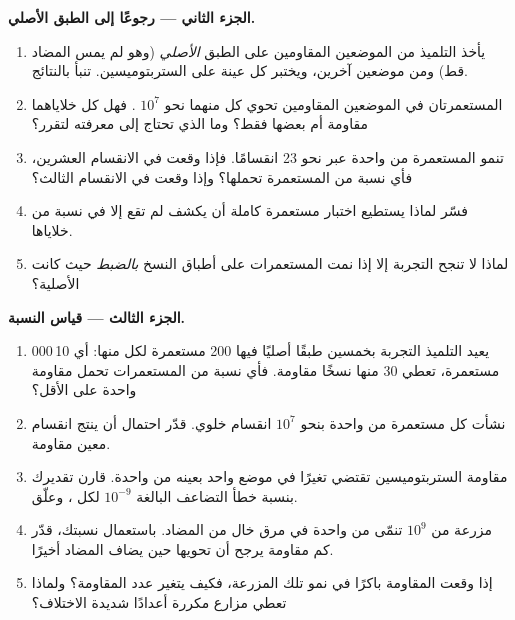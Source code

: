 \begin{problem}
\medskip
\noindent\textbf{الجزء الثاني --- رجوعًا إلى الطبق الأصلي.}
\begin{enumerate}[resume]
  \item يأخذ التلميذ  من الموضعين المقاومين على الطبق
        \emph{الأصلي} (وهو لم يمس المضاد قط) ومن موضعين آخرين، ويختبر
        كل عينة على الستربتوميسين. تنبأ بالنتائج.
  \item المستعمرتان في الموضعين المقاومين تحوي كل منهما نحو $10^7$
        . فهل كل خلاياهما مقاومة أم بعضها فقط؟ وما الذي تحتاج إلى
        معرفته لتقرر؟
  \item تنمو المستعمرة من  واحدة عبر نحو 23 انقسامًا. فإذا وقعت
         في الانقسام العشرين، فأي نسبة من  المستعمرة
        تحملها؟ وإذا وقعت في الانقسام الثالث؟
  \item فسّر لماذا يستطيع اختبار مستعمرة كاملة أن يكشف  لم تقع إلا
        في نسبة من خلاياها.
  \item لماذا لا تنجح التجربة إلا إذا نمت المستعمرات على أطباق النسخ
        \emph{بالضبط} حيث كانت الأصلية؟
\end{enumerate}

\medskip
\noindent\textbf{الجزء الثالث --- قياس النسبة.}
\begin{enumerate}[resume]
  \item يعيد التلميذ التجربة بخمسين طبقًا أصليًا فيها 200 مستعمرة لكل
        منها: أي 10\,000 مستعمرة، تعطي 30 منها نسخًا مقاومة. فأي نسبة
        من المستعمرات تحمل  مقاومة واحدة على الأقل؟
  \item نشأت كل مستعمرة من  واحدة بنحو $10^7$ انقسام خلوي. قدّر
        احتمال أن ينتج انقسام معين  مقاومة.
  \item مقاومة الستربتوميسين تقتضي تغيرًا في موضع واحد بعينه من 
        واحدة. قارن تقديرك بنسبة خطأ التضاعف البالغة $10^{-9}$ لكل
        ، وعلّق.
  \item مزرعة من $10^9$  تنمّى من  واحدة في مرق خال من المضاد.
        باستعمال نسبتك، قدّر كم  مقاومة يرجح أن تحويها حين يضاف
        المضاد أخيرًا.
  \item إذا وقعت  المقاومة باكرًا في نمو تلك المزرعة، فكيف يتغير
        عدد  المقاومة؟ ولماذا تعطي مزارع مكررة أعدادًا شديدة
        الاختلاف؟
\end{enumerate}


\end{problem}
